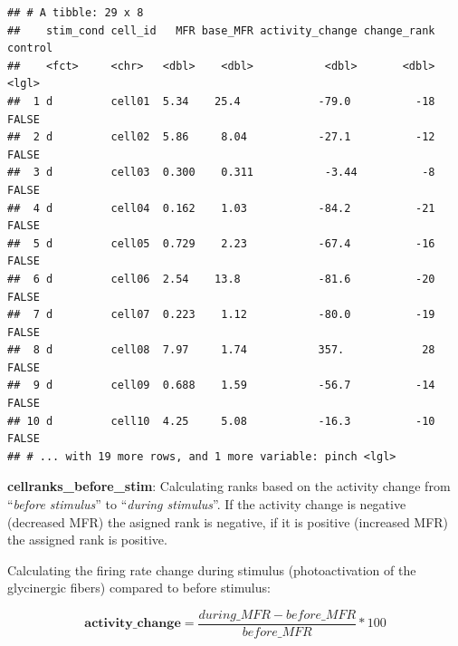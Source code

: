 \documentclass[12pt,]{article}
\newenvironment{Shaded}{\begin{snugshade}}{\end{snugshade}}
\newcommand{\DataTypeTok}[1]{\textcolor[rgb]{0.13,0.29,0.53}{#1}}
\newcommand{\DecValTok}[1]{\textcolor[rgb]{0.00,0.00,0.81}{#1}}
\newcommand{\KeywordTok}[1]{\textcolor[rgb]{0.13,0.29,0.53}{\textbf{#1}}}
\newcommand{\NormalTok}[1]{#1}
\newcommand{\OperatorTok}[1]{\textcolor[rgb]{0.81,0.36,0.00}{\textbf{#1}}}
\newcommand{\StringTok}[1]{\textcolor[rgb]{0.31,0.60,0.02}{#1}}
\begin{document}
\begin{verbatim}
## # A tibble: 29 x 8
##    stim_cond cell_id   MFR base_MFR activity_change change_rank control
##    <fct>     <chr>   <dbl>    <dbl>           <dbl>       <dbl> <lgl>  
##  1 d         cell01  5.34    25.4            -79.0          -18 FALSE  
##  2 d         cell02  5.86     8.04           -27.1          -12 FALSE  
##  3 d         cell03  0.300    0.311           -3.44          -8 FALSE  
##  4 d         cell04  0.162    1.03           -84.2          -21 FALSE  
##  5 d         cell05  0.729    2.23           -67.4          -16 FALSE  
##  6 d         cell06  2.54    13.8            -81.6          -20 FALSE  
##  7 d         cell07  0.223    1.12           -80.0          -19 FALSE  
##  8 d         cell08  7.97     1.74           357.            28 FALSE  
##  9 d         cell09  0.688    1.59           -56.7          -14 FALSE  
## 10 d         cell10  4.25     5.08           -16.3          -10 FALSE  
## # ... with 19 more rows, and 1 more variable: pinch <lgl>
\end{verbatim}

\textbf{cellranks\_before\_stim}: Calculating ranks based on the
activity change from ``\emph{before stimulus}'' to ``\emph{during
stimulus}''. If the activity change is negative (decreased MFR) the
asigned rank is negative, if it is positive (increased MFR) the assigned
rank is positive.

Calculating the firing rate change during stimulus (photoactivation of
the glycinergic fibers) compared to before stimulus:

\[\mathbf{activity\_change} = \frac{during\_MFR - before\_MFR}{before\_MFR} * 100\]

\begin{Shaded}
\end{Shaded}
\end{document}
